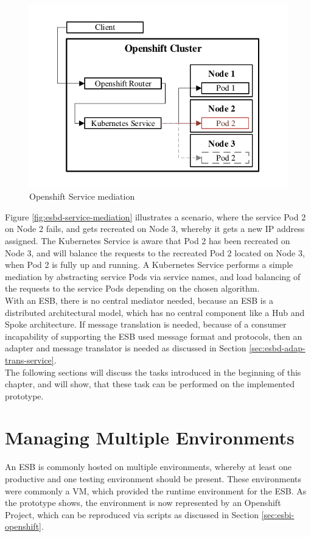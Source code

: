 \begin{figure}[htbp]
	\centering
	\includegraphics[scale=1]{images/esbd-service-mediation.pdf}
	\caption{Openshift Service mediation}
	\label{fig:esbd-service-mediation}
\end{figure}

Figure \vref{fig:esbd-service-mediation} illustrates a scenario, where the service Pod 2 on Node 2 fails, and gets recreated on Node 3, whereby it gets a new IP address assigned. The Kubernetes Service is aware that Pod 2 has been recreated on Node 3, and will balance the requests to the recreated Pod 2 located on Node 3, when Pod 2 is fully up and running. A Kubernetes Service performs a simple mediation by abstracting service Pods via service names, and load balancing of the requests to the service Pods depending on the chosen algorithm. \\

With an ESB, there is no central mediator needed, because an ESB is a distributed architectural model, which has no central component like a Hub and Spoke architecture. If message translation is needed, because of a consumer incapability of supporting the ESB used message format and protocols, then an adapter and message translator is needed as discussed in Section \vref{sec:esbd-adap-trans-service}. \\

The following sections will discuss the tasks introduced in the beginning of this chapter, and will show, that these task can be performed on the implemented prototype.

\section{Managing Multiple Environments}
\label{sec:esbd-multiple-env}
An ESB is commonly hosted on multiple environments, whereby at least one productive and one testing environment should be present. These environments were commonly a VM, which provided the runtime environment for the ESB. As the prototype shows, the environment is now represented by an Openshift Project, which can be reproduced via scripts as discussed in Section \vref{sec:esbi-openshift}. \\

